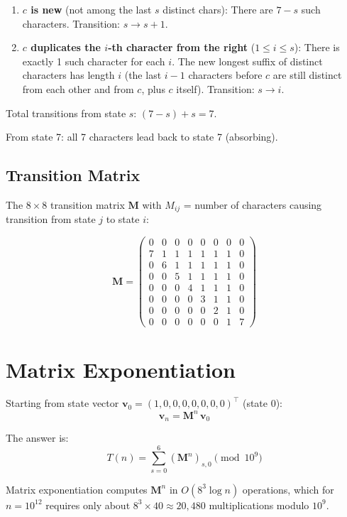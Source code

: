 \documentclass[11pt]{article}
\begin{document}
\begin{enumerate}
    \item \textbf{$c$ is new} (not among the last $s$ distinct chars): There are $7 - s$ such
          characters. Transition: $s \to s + 1$.
    \item \textbf{$c$ duplicates the $i$-th character from the right} ($1 \le i \le s$): There is
          exactly 1 such character for each $i$. The new longest suffix of distinct characters
          has length $i$ (the last $i-1$ characters before $c$ are still distinct from each other
          and from $c$, plus $c$ itself). Transition: $s \to i$.
\end{enumerate}

Total transitions from state $s$: $(7 - s) + s = 7$. \checkmark

From state 7: all 7 characters lead back to state 7 (absorbing).

\subsection{Transition Matrix}

The $8 \times 8$ transition matrix $\mathbf{M}$ with $M_{ij}$ = number of characters causing
transition from state $j$ to state $i$:

\[
\mathbf{M} = \begin{pmatrix}
0 & 0 & 0 & 0 & 0 & 0 & 0 & 0 \\
7 & 1 & 1 & 1 & 1 & 1 & 1 & 0 \\
0 & 6 & 1 & 1 & 1 & 1 & 1 & 0 \\
0 & 0 & 5 & 1 & 1 & 1 & 1 & 0 \\
0 & 0 & 0 & 4 & 1 & 1 & 1 & 0 \\
0 & 0 & 0 & 0 & 3 & 1 & 1 & 0 \\
0 & 0 & 0 & 0 & 0 & 2 & 1 & 0 \\
0 & 0 & 0 & 0 & 0 & 0 & 1 & 7
\end{pmatrix}
\]

\section{Matrix Exponentiation}

Starting from state vector $\mathbf{v}_0 = (1, 0, 0, 0, 0, 0, 0, 0)^\top$ (state 0):
\[
\mathbf{v}_n = \mathbf{M}^n \, \mathbf{v}_0
\]

The answer is:
\[
T(n) = \sum_{s=0}^{6} (\mathbf{M}^n)_{s,0} \pmod{10^9}
\]

Matrix exponentiation computes $\mathbf{M}^n$ in $O(8^3 \log n)$ operations, which for
$n = 10^{12}$ requires only about $8^3 \times 40 \approx 20{,}480$ multiplications modulo $10^9$.
\end{document}
